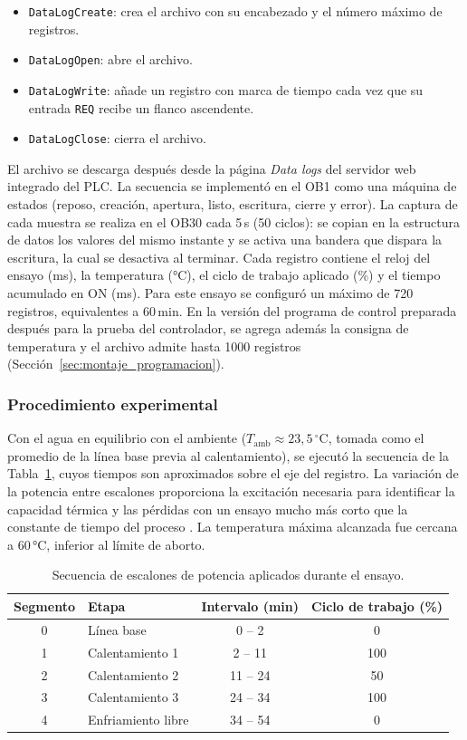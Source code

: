 \begin{itemize}
\item \texttt{DataLogCreate}: crea el archivo con su encabezado y el número máximo de registros.
\item \texttt{DataLogOpen}: abre el archivo.
\item \texttt{DataLogWrite}: añade un registro con marca de tiempo cada vez que su entrada \texttt{REQ} recibe un flanco ascendente.
\item \texttt{DataLogClose}: cierra el archivo.
\end{itemize}

El archivo se descarga después desde la página \textit{Data logs} del servidor web integrado del PLC. La secuencia se implementó en el OB1 como una máquina de estados (reposo, creación, apertura, listo, escritura, cierre y error). La captura de cada muestra se realiza en el OB30 cada 5\,s (50 ciclos): se copian en la estructura de datos los valores del mismo instante y se activa una bandera que dispara la escritura, la cual se desactiva al terminar. Cada registro contiene el reloj del ensayo (ms), la temperatura (°C), el ciclo de trabajo aplicado (\%) y el tiempo acumulado en ON (ms). Para este ensayo se configuró un máximo de 720 registros, equivalentes a 60\,min. En la versión del programa de control preparada después para la prueba del controlador, se agrega además la consigna de temperatura y el archivo admite hasta 1000 registros (Sección~\ref{sec:montaje_programacion}).

\subsubsection{Procedimiento experimental}

Con el agua en equilibrio con el ambiente ($T_{\mathrm{amb}} \approx 23{,}5\,^{\circ}\mathrm{C}$, tomada como el promedio de la línea base previa al calentamiento), se ejecutó la secuencia de la Tabla~\ref{tab:escalones_potencia}, cuyos tiempos son aproximados sobre el eje del registro. La variación de la potencia entre escalones proporciona la excitación necesaria para identificar la capacidad térmica y las pérdidas con un ensayo mucho más corto que la constante de tiempo del proceso \cite{seborg2016process}. La temperatura máxima alcanzada fue cercana a 60\,°C, inferior al límite de aborto.

\begin{table}[H]
\centering
\caption{Secuencia de escalones de potencia aplicados durante el ensayo.}
\label{tab:escalones_potencia}
\begin{tabular}{clcc}
\toprule
Segmento & Etapa & Intervalo (min) & Ciclo de trabajo (\%) \\
\midrule
0 & Línea base         & 0 -- 2   & 0   \\
1 & Calentamiento 1    & 2 -- 11  & 100 \\
2 & Calentamiento 2    & 11 -- 24 & 50  \\
3 & Calentamiento 3    & 24 -- 34 & 100 \\
4 & Enfriamiento libre & 34 -- 54 & 0   \\
\bottomrule
\end{tabular}
\end{table}

